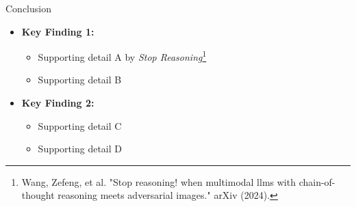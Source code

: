 \documentclass[aspectratio=169,12pt]{beamer}
\begin{document}
\begin{frame}{Conclusion}
    \begin{itemize}
        \item \textbf{Key Finding 1:}
        \begin{itemize}
            \item Supporting detail A by \emph{Stop Reasoning}\footnote{Wang, Zefeng, et al. "Stop reasoning! when multimodal llms with chain-of-thought reasoning meets adversarial images." arXiv (2024).}
            \item Supporting detail B
        \end{itemize} \pause
        \item \textbf{Key Finding 2:}
        \begin{itemize}
            \item Supporting detail C
            \item Supporting detail D
        \end{itemize}
    \end{itemize}
\end{frame}
\end{document}
